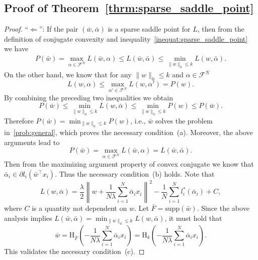 \documentclass[11pt]{article}
\newcommand{\supp}{\text{supp}}
\numberwithin{equation}{section}
\numberwithin{table}{section}
\numberwithin{figure}{section}
\begin{document}
\subsection{Proof of Theorem~\ref{thrm:sparse_saddle_point}}
\label{append:proof_sparse_saddle_point}
\begin{proof}
``$\Leftarrow$'': If the pair $(\bar w, \bar \alpha)$ is a sparse saddle point for $L$, then from the definition of conjugate convexity and inequality~\eqref{inequat:sparse_saddle_point} we have
\[
\begin{aligned}
P(\bar w) =\max_{\alpha \in \mathcal{F}^N} L(\bar w, \alpha) \le L(\bar w, \bar \alpha) \le \min_{\|w\|_0 \le k} L(w,\bar \alpha).
\end{aligned}
\]
On the other hand, we know that for any $\|w\|_0\le k$ and $\alpha \in \mathcal{F}^N$
\[
L(w,\alpha) \le \max_{\alpha' \in \mathcal{F}^N} L(w, \alpha') = P(w).
\]
By combining the preceding two inequalities we obtain
\[
P(\bar w) \le \min_{\|w\|_0 \le k} L(w,\bar \alpha) \le \min_{\|w\|_0\le k} P(w) \le P(\bar w).
\]
Therefore $P(\bar w)= \min_{\|w\|_0\le k} P(w)$, i.e., $\bar w$ solves the problem in~\eqref{prob:general}, which proves the necessary condition~(a). Moreover, the above arguments lead to
\[
P(\bar w) =\max_{\alpha \in \mathcal{F}^N} L(\bar w, \alpha) = L(\bar w, \bar \alpha).
\]
Then from the maximizing argument property of convex conjugate we know that $\bar\alpha_i \in \partial l_i(\bar w^\top x_i)$. Thus the necessary condition~(b) holds. Note that
\begin{equation}\label{equat:L_quadratic}
L(w,\bar \alpha) = \frac{\lambda}{2}\left\| w + \frac{1}{N\lambda}\sum_{i=1}^N \bar\alpha_i x_i\right\|^2 - \frac{1}{N}\sum_{i=1}^N l^*_i(\bar \alpha_i)+ C,
\end{equation}
where $C$ is a quantity not dependent on $w$. Let $\bar F=\supp(\bar w)$. Since the above analysis implies $L(\bar w, \bar \alpha) = \min_{\|w\|_0 \le k} L(w,\bar \alpha)$, it must hold that
\[
\bar w = \mathrm{H}_{\bar F}\left(-\frac{1}{N\lambda} \sum_{i=1}^N \bar\alpha_i x_i \right)=\mathrm{H}_k\left(-\frac{1}{N\lambda} \sum_{i=1}^N \bar\alpha_i x_i \right).
\]
This validates the necessary condition~(c).


\end{proof}
\end{document}

